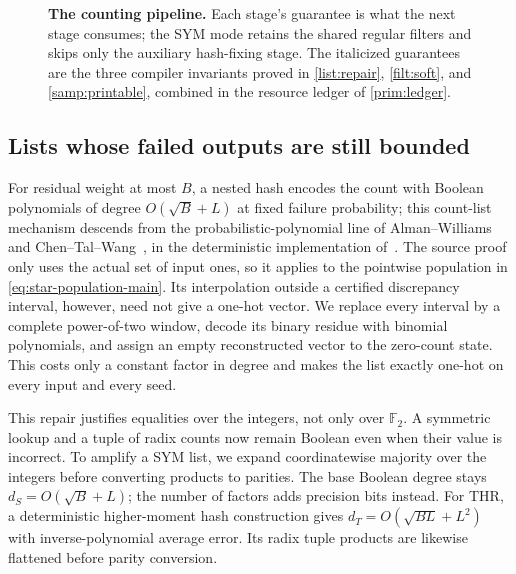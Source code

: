 \documentclass[11pt,letterpaper]{article}
\theoremstyle{definition}
\theoremstyle{remark}
\newcommand{\F}{\mathbb F}
\begin{document}
\begin{figure}[tp]
\caption{\textbf{The counting pipeline.} Each stage's guarantee is what
the next stage consumes; the SYM mode retains the shared regular filters
and skips only the auxiliary hash-fixing stage. The
italicized guarantees are the three compiler invariants proved in
\cref{list:repair}, \cref{filt:soft}, and \cref{samp:printable},
combined in the resource ledger of \cref{prim:ledger}.}
\label{fig:pipeline}
\end{figure}

\subsection{Lists whose failed outputs are still bounded}
For residual weight at most $B$, a nested hash encodes the count with
Boolean polynomials of degree $O(\sqrt B+L)$ at fixed failure
probability; this count-list mechanism descends from the
probabilistic-polynomial line of Alman--Williams and
Chen--Tal--Wang~\cite{AlmanWilliams,CTW}, in the deterministic
implementation of~\cite{NagCubic}.
The source proof only uses the actual set of input ones, so it applies
to the pointwise population in \cref{eq:star-population-main}.
Its interpolation outside a certified discrepancy interval, however,
need not give a one-hot vector. We replace every interval by a complete
power-of-two window, decode its binary residue with binomial
polynomials, and assign an empty reconstructed vector to the zero-count
state. This costs only a constant factor in degree and makes the list
exactly one-hot on every input and every seed.

This repair justifies equalities over the integers, not only over
$\F_2$. A symmetric lookup and a tuple of radix counts now remain
Boolean even when their value is incorrect. To amplify a SYM list, we
expand coordinatewise majority over the integers before converting
products to parities. The base Boolean degree stays
$d_S=O(\sqrt B+L)$; the number of factors adds precision bits instead.
For THR, a deterministic higher-moment hash construction gives
$d_T=O(\sqrt{BL}+L^2)$ with inverse-polynomial average error. Its radix
tuple products are likewise flattened before parity conversion.
\end{document}

